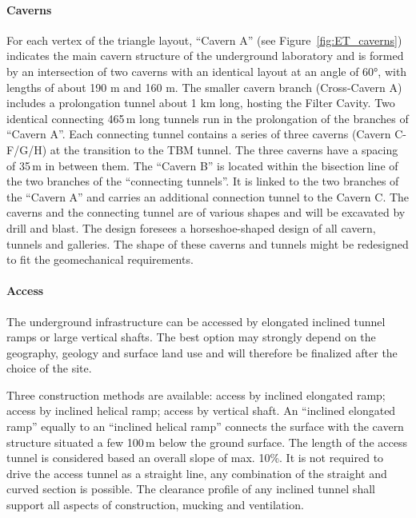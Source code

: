 \paragraph{Caverns}

For each vertex of the triangle layout, “Cavern A” (see Figure~\ref{fig:ET_caverns}) indicates the main cavern structure of the underground laboratory and is formed by an intersection of two caverns with an identical layout at an angle of 60°, with lengths of about 190 m and 160 m.
The smaller cavern branch (Cross-Cavern A) includes a prolongation tunnel about 1 km long, hosting the Filter Cavity. 
Two identical connecting 465\,m long tunnels run in the prolongation of the branches of “Cavern A”. Each connecting tunnel contains a series of three caverns (Cavern C-F/G/H) at the transition to the TBM tunnel. The three caverns have a spacing of 35\,m in between them. 
The “Cavern B” is located within the bisection line of the two branches of the “connecting tunnels”. It is linked to the two branches of the “Cavern A” and carries an additional connection tunnel to the Cavern C. 
The caverns and the connecting tunnel are of various shapes and will be excavated by drill and blast. The design foresees a horseshoe-shaped design of all cavern, tunnels and galleries. The shape of these caverns and tunnels might be redesigned to fit the geomechanical requirements.

\paragraph{Access}
    
The underground infrastructure can be accessed by elongated inclined tunnel ramps or large vertical shafts. The best option may strongly depend on the geography, geology and surface land use and will therefore be finalized after the choice of the site. 

Three construction methods are available: access by inclined elongated ramp; access by inclined helical ramp; access by vertical shaft.
An “inclined elongated ramp” equally to an “inclined helical ramp” connects the
surface with the cavern structure situated a few 100\,m below the ground surface. The length of the access tunnel is considered based an overall slope of max. 10\%. It is not required to drive the access tunnel as a straight line, any combination of the straight and curved section is possible.
The clearance profile of any inclined tunnel shall support all aspects of construction, mucking and ventilation. 

